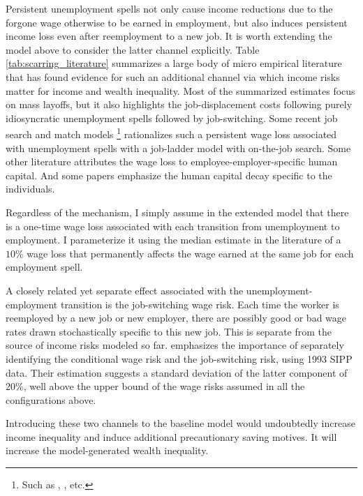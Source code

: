 Persistent unemployment spells not only cause income reductions due to the forgone wage otherwise to be earned in employment, but also induces persistent income loss even after reemployment to a new job. It is worth extending the model above to consider the latter channel explicitly. Table \ref{tab:scarring_literature} summarizes a large body of micro empirical literature that has found evidence for such an additional channel via which income risks matter for income and wealth inequality. Most of the summarized estimates focus on mass layoffs, but it also highlights the job-displacement costs following purely idiosyncratic unemployment spells followed by job-switching. Some recent job search and match models \footnote{Such as \cite{low2010wage}, \cite{lachowska2020sources}, etc.} rationalizes such a persistent wage loss associated with unemployment spells with a job-ladder model with on-the-job search. Some other literature attributes the wage loss to employee-employer-specific human capital. And some papers emphasize the human capital decay specific to the individuals. 

Regardless of the mechanism, I simply assume in the extended model that there is a one-time wage loss associated with each transition from unemployment to employment. I parameterize it using the median estimate in the literature of a $10\%$ wage loss that permanently affects the wage earned at the same job for each employment spell. 

A closely related yet separate effect associated with the unemployment-employment transition is the job-switching wage risk. Each time the worker is reemployed by a new job or new employer, there are possibly good or bad wage rates drawn stochastically specific to this new job. This is separate from the source of income risks modeled so far.  \cite{low2010wage} emphasizes the importance of separately identifying the conditional wage risk and the job-switching risk, using 1993 SIPP data. Their estimation suggests a standard deviation of the latter component of $20\%$, well above the upper bound of the wage risks assumed in all the configurations above. 

Introducing these two channels to the baseline model would undoubtedly increase income inequality and induce additional precautionary saving motives. It will increase the model-generated wealth inequality.  